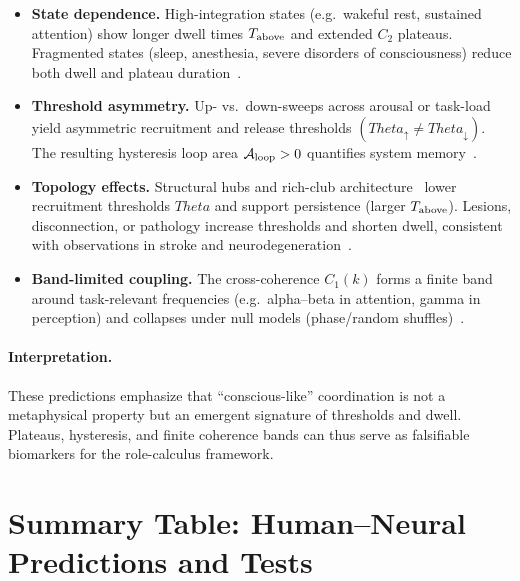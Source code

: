 \documentclass[12pt,a4paper,oneside]{scrreprt}
\def\Theta{Theta}%
\begin{document}
\begin{itemize}
\item \textbf{State dependence.} 
High-integration states (e.g.\ wakeful rest, sustained attention) 
show longer dwell times $T_{\rm above}$ and extended $C_2$ plateaus. 
Fragmented states (sleep, anesthesia, severe disorders of consciousness) 
reduce both dwell and plateau duration~\cite{tononi2004information,boly2012consciousness}.

\item \textbf{Threshold asymmetry.} 
Up- vs.\ down-sweeps across arousal or task-load 
yield asymmetric recruitment and release thresholds $(\Theta_\uparrow\neq\Theta_\downarrow)$. 
The resulting hysteresis loop area $\mathcal A_{\rm loop}>0$ quantifies system memory~\cite{massimini2005breakdown,decoding2018}.

\item \textbf{Topology effects.} 
Structural hubs and rich-club architecture~\cite{van2011rich} 
lower recruitment thresholds $\Theta$ and support persistence (larger $T_{\rm above}$). 
Lesions, disconnection, or pathology increase thresholds and shorten dwell, 
consistent with observations in stroke and neurodegeneration~\cite{gratton2012functional}.

\item \textbf{Band-limited coupling.} 
The cross-coherence $C_1(k)$ forms a finite band around task-relevant frequencies 
(e.g.\ alpha–beta in attention, gamma in perception) 
and collapses under null models (phase/random shuffles)~\cite{engel2001dynamic,bastos2016tutorial}.
\end{itemize}

\paragraph{Interpretation.} 
These predictions emphasize that ``conscious-like'' coordination is not a metaphysical property but an 
emergent signature of thresholds and dwell. 
Plateaus, hysteresis, and finite coherence bands can thus serve as falsifiable biomarkers 
for the role-calculus framework.

\section*{Summary Table: Human--Neural Predictions and Tests}
\end{document}
